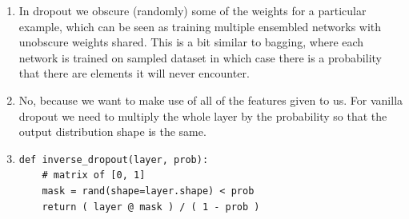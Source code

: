 \begin{exercise}
\begin{enumerate}
    \item In dropout we obscure (randomly) some of the weights for a particular example, which can be seen as training multiple ensembled networks with unobscure weights shared. This is a bit similar to bagging, where each network is trained on sampled dataset in which case there is a probability that there are elements it will never encounter.
    \item No, because we want to make use of all of the features given to us. For vanilla dropout we need to multiply the whole layer by the probability so that the output distribution shape is the same.\\
    \linebreak
    \item
    \begin{lstlisting}
def inverse_dropout(layer, prob):
    # matrix of [0, 1]
    mask = rand(shape=layer.shape) < prob
    return ( layer @ mask ) / ( 1 - prob ) 
    \end{lstlisting}
\end{enumerate}
\end{exercise}

